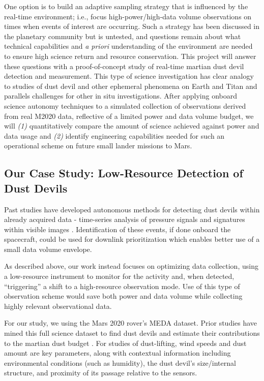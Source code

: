 One option is to build an adaptive sampling strategy that is influenced by the real-time environment; i.e., focus high-power/high-data volume observations on times when events of interest are occurring. Such a strategy has been discussed in the planetary community \citep[e.g.,][]{Diniega2022,Jackson2023} but is untested, and questions remain about what technical capabilities and \textit{a priori} understanding of the environment are needed to ensure high science return and resource conservation. 
This project will answer these questions with a proof-of-concept study of real-time martian dust devil detection and measurement. 
This type of science investigation has clear analogy to studies of dust devil and other ephemeral phenomena on Earth \citep[e.g.,][]{Jackson2015} and Titan \citep{Lorenz2021} and parallels challenges for other in situ investigations. After applying onboard science autonomy techniques to a simulated collection of observations derived from real M2020 data, reflective of a limited power and data volume budget, we will \emph{(1)} quantitatively compare the amount of science achieved against power and data usage and \emph{(2)} identify engineering capabilities needed for such an operational scheme on future small lander missions to Mars.

\subsection{Our Case Study: Low-Resource Detection of Dust Devils}
Past studies have developed autonomous methods for detecting dust devils within already acquired data - time-series analysis of pressure signals and signatures within visible images \citep[e.g.][]{Castano2008,Guzewich2023}. 
Identification of these events, if done onboard the spacecraft, could be used for downlink prioritization which enables better use of a small data volume envelope. 

As described above, our work instead focuses on optimizing data collection, using a low-resource instrument to monitor for the activity and, when detected, ``triggering'' a shift to a high-resource observation mode. 
Use of this type of observation scheme would save both power and data volume while collecting highly relevant observational data.

For our study, we using the Mars 2020 rover's \gls{MEDA} dataset. %
Prior studies have mined this full science dataset to find dust devils and estimate their contributions to the martian dust budget \citep{Jackson2022,Jackson2022b}.
For studies of dust-lifting, wind speeds and dust amount are key parameters, along with contextual information including environmental conditions (such as humidity), the dust devil's size/internal structure, and proximity of its passage relative to the sensors. 

